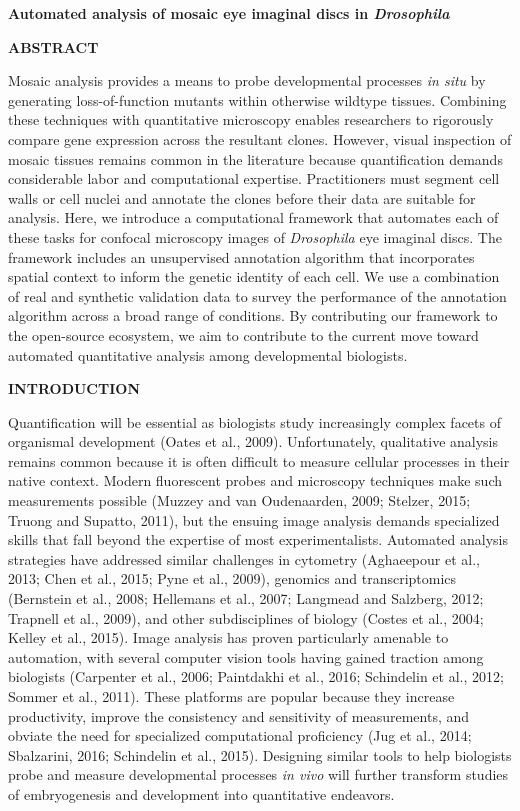 \textbf{Automated analysis of mosaic eye imaginal discs in \emph{Drosophila}}

\textbf{ABSTRACT}

Mosaic analysis provides a means to probe developmental processes \emph{in situ} by generating loss-of-function mutants within otherwise wildtype tissues. Combining these techniques with quantitative microscopy enables researchers to rigorously compare gene expression across the resultant clones. However, visual inspection of mosaic tissues remains common in the literature because quantification demands considerable labor and computational expertise. Practitioners must segment cell walls or cell nuclei and annotate the clones before their data are suitable for analysis. Here, we introduce a computational framework that automates each of these tasks for confocal microscopy images of \emph{Drosophila} eye imaginal discs. The framework includes an unsupervised annotation algorithm that incorporates spatial context to inform the genetic identity of each cell. We use a combination of real and synthetic validation data to survey the performance of the annotation algorithm across a broad range of conditions. By contributing our framework to the open-source ecosystem, we aim to contribute to the current move toward automated quantitative analysis among developmental biologists.

\textbf{INTRODUCTION}

Quantification will be essential as biologists study increasingly complex facets of organismal development (Oates et al., 2009). Unfortunately, qualitative analysis remains common because it is often difficult to measure cellular processes in their native context. Modern fluorescent probes and microscopy techniques make such measurements possible (Muzzey and van Oudenaarden, 2009; Stelzer, 2015; Truong and Supatto, 2011), but the ensuing image analysis demands specialized skills that fall beyond the expertise of most experimentalists. Automated analysis strategies have addressed similar challenges in cytometry (Aghaeepour et al., 2013; Chen et al., 2015; Pyne et al., 2009), genomics and transcriptomics (Bernstein et al., 2008; Hellemans et al., 2007; Langmead and Salzberg, 2012; Trapnell et al., 2009), and other subdisciplines of biology (Costes et al., 2004; Kelley et al., 2015). Image analysis has proven particularly amenable to automation, with several computer vision tools having gained traction among biologists (Carpenter et al., 2006; Paintdakhi et al., 2016; Schindelin et al., 2012; Sommer et al., 2011). These platforms are popular because they increase productivity, improve the consistency and sensitivity of measurements, and obviate the need for specialized computational proficiency (Jug et al., 2014; Sbalzarini, 2016; Schindelin et al., 2015). Designing similar tools to help biologists probe and measure developmental processes \emph{in vivo} will further transform studies of embryogenesis and development into quantitative endeavors.

